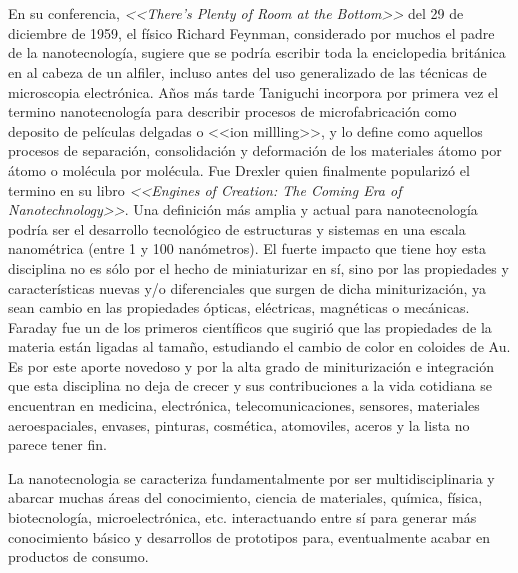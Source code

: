 \section{}
En su conferencia, \textit{<<There's Plenty of Room at the Bottom>>} del 29 de diciembre de 1959, el físico Richard Feynman, considerado por muchos el padre de la nanotecnología, sugiere que se podría escribir toda la enciclopedia británica en al cabeza de un alfiler, incluso antes del uso generalizado de las técnicas de microscopia electrónica.\cite{Feynman1959}  Años más tarde Taniguchi incorpora por primera vez el termino nanotecnología para describir procesos de microfabricación como deposito de películas delgadas o <<ion millling>>, y lo define como aquellos procesos de separación, consolidación y deformación de los materiales átomo por átomo o molécula por molécula. \cite{taniguchi1974} Fue Drexler quien finalmente popularizó el termino en su libro \textit{<<Engines of Creation: The Coming Era of Nanotechnology>>}\cite{drexler1986}. Una definición más amplia y actual para nanotecnología podría ser el desarrollo tecnológico de estructuras y sistemas en una escala nanométrica (entre 1 y 100 nanómetros). El fuerte impacto que tiene hoy esta disciplina no es sólo por el hecho de miniaturizar en sí, sino por las propiedades y características nuevas y/o diferenciales que surgen de dicha miniturización, ya sean cambio en las propiedades ópticas, eléctricas, magnéticas o mecánicas. Faraday fue un de los primeros científicos que sugirió que las propiedades de la materia están ligadas al tamaño, estudiando el cambio de color en coloides de Au\cite{faraday1857}. Es por este aporte novedoso y por la alta grado de miniturización e integración que esta disciplina no deja de crecer y sus contribuciones a la vida cotidiana se encuentran en medicina, electrónica, telecomunicaciones, sensores, materiales aeroespaciales, envases, pinturas, cosmética, atomoviles, aceros y la lista no parece tener fin. 

La nanotecnologia se caracteriza fundamentalmente por ser multidisciplinaria y abarcar muchas áreas del conocimiento, ciencia de materiales, química, física, biotecnología, microelectrónica, etc. interactuando entre sí para generar más conocimiento básico y desarrollos de prototipos para, eventualmente acabar en productos de consumo.

